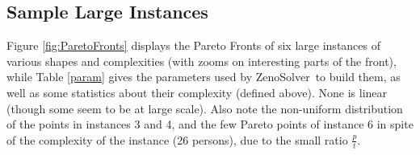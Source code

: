 \documentclass{llncs}
\def\ZENOSOLVER{{\sc ZenoSolver}}
\begin{document}
% 

\subsection{Sample Large Instances}
Figure \ref{fig:ParetoFronts} displays the Pareto Fronts of six large instances of various shapes and complexities (with zooms on interesting parts of the front), while Table \ref{param} gives the parameters used by \ZENOSOLVER\ to build them, as well as some statistics about their complexity (defined above). None is linear (though some seem to be at large scale). Also note the non-uniform distribution of the points in instances 3 and 4, and the few Pareto points of instance 6 in spite of the complexity of the instance (26 persons), due to the small ratio $\frac p t$.
\end{document}
